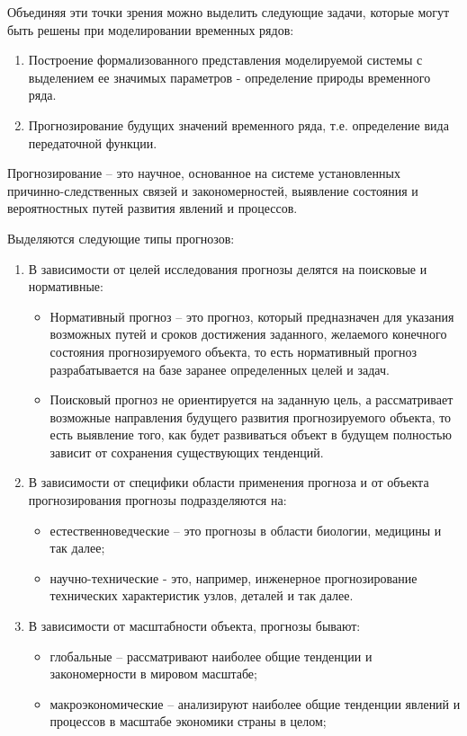 Объединяя эти точки зрения можно выделить следующие задачи, которые могут быть решены при моделировании временных рядов:
\begin{enumerate}
\item Построение формализованного представления моделируемой системы с выделением ее значимых параметров - определение природы временного ряда.
\item Прогнозирование будущих значений временного ряда, т.е. определение вида передаточной функции.
\end{enumerate}
Прогнозирование -- это научное, основанное на системе установленных причинно-следственных связей и закономерностей, выявление состояния и вероятностных путей развития явлений и процессов.

Выделяются следующие типы прогнозов:
\begin{enumerate}
\item В зависимости от целей исследования прогнозы делятся на поисковые и нормативные:
	\begin{itemize}
	\item Нормативный прогноз – это прогноз, который предназначен для указания возможных путей и сроков достижения заданного, желаемого конечного состояния прогнозируемого объекта, то есть нормативный прогноз разрабатывается на базе заранее определенных целей и задач.
	\item Поисковый прогноз не ориентируется на заданную цель, а рассматривает
возможные направления будущего развития прогнозируемого объекта, то есть выявление того, как будет развиваться объект в будущем полностью зависит от сохранения существующих тенденций.
	\end{itemize}
\item В зависимости от специфики области применения прогноза
и от объекта прогнозирования прогнозы подразделяются на:
	\begin{itemize}
		\item естественноведческие – это прогнозы в области биологии, медицины и так далее;
		\item научно-технические - это, например, инженерное прогнозирование технических характеристик узлов, деталей и 	так далее.
		\end{itemize}
\item В зависимости от масштабности объекта, прогнозы бывают:
	\begin{itemize}
	\item глобальные – рассматривают наиболее общие тенденции и закономерности в мировом масштабе;
	\item макроэкономические – анализируют наиболее общие тенденции явлений и процессов в масштабе экономики страны в целом;

\end{itemize}
\end{enumerate}
